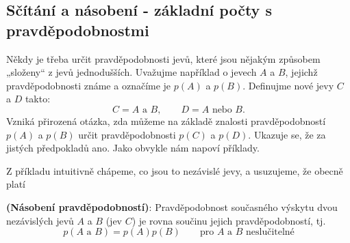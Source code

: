       

      

      

    \subsection{Sčítání a násobení - základní počty s pravděpodobnostmi}
      Někdy je třeba určit pravděpodobnosti jevů, které jsou nějakým způsobem „složeny“ z jevů
      jednodušších. Uvažujme například o jevech \(A\) a \(B\), jejichž pravděpodobnosti známe a 
      označíme je \(p(A)\) a \(p(B)\). Definujme nové jevy \(C\) a \(D\) takto:
      \begin{equation*}
        C = A \text{ a } B, \qquad D = A \text{ nebo } B.
      \end{equation*}
      Vzniká přirozená otázka, zda můžeme na základě znalosti pravděpodobností \(p(A)\) a \(p(B)\) 
      určit pravděpodobnosti \(p(C)\) a \(p(D)\). Ukazuje se, že za jistých předpokladů ano. Jako 
      obvykle nám napoví příklady.

      
      
      Z příkladu intuitivně chápeme, co jsou to nezávislé jevy, a usuzujeme, že obecně platí
      \begin{lemma}\label{mai:lemma003}
        \textbf{(Násobení pravděpodobností)}: Pravděpodobnost současného výskytu dvou nezávislých 
        jevů \(A\) a \(B\) (jev \(C\)) je rovna součinu jejich pravděpodobností, tj.
        \begin{equation}\label{mai:eq052}
           p(A \text{ a } B)= p(A)p(B)\qquad \text{pro } A \text{ a } B \text{ neslučitelné}
        \end{equation}
      \end{lemma}
      
